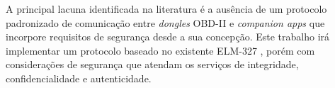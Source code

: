 A principal lacuna identificada na literatura é a ausência de um protocolo
padronizado de comunicação entre \textit{dongles} OBD-II e \textit{companion apps}
que incorpore requisitos de segurança desde a sua concepção. Este trabalho irá implementar um protocolo baseado no existente ELM-327 \cite{elm327datasheet}, porém com considerações de segurança que atendam os serviços de integridade, confidencialidade e autenticidade.

 
